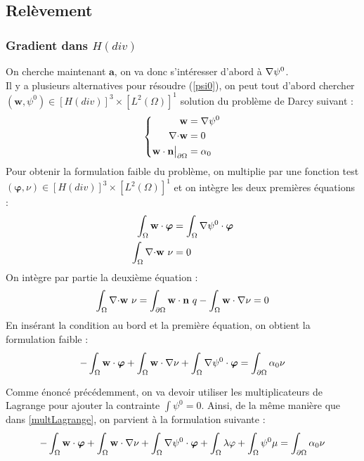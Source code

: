 \subsection{Relèvement}
\label{relev}

\subsubsection{Gradient dans $H(div)$}

On cherche maintenant $\mathbf{a}$, on va donc s'intéresser d'abord à ${\nabla}\psi^0$.\\
Il y a plusieurs alternatives pour résoudre (\ref{psi0}), on peut tout d'abord chercher $(\mathbf{w},\psi^0)\in [H(div)]^3\times [L^2(\Omega)]^1$ solution du problème de Darcy suivant :
\begin{equation}
\label{pbpsidiv}
\left\{
\begin{aligned}
\mathbf{w} &= {\nabla} \psi^0\\
{\nabla\cdot} \mathbf{w} &= 0\\
\mathbf{w}\cdot \mathbf{n}{\big\rvert_{\partial\Omega}} &= \alpha_0
\end{aligned}
\right.
\end{equation}
Pour obtenir la formulation faible du problème, on multiplie par une fonction test $(\bm{\varphi},\nu)\in [H(div)]^3\times [L^2(\Omega)]^1$ et on intègre les deux premières équations :
\begin{align*}
\int_\Omega \mathbf{w}\cdot\bm{\varphi} &= \int_\Omega {\nabla}\psi^0\cdot\bm{\varphi}\\
\int_\Omega {\nabla\cdot} \mathbf{w}\ \nu &= 0
\end{align*}
On intègre par partie la deuxième équation :
\[
\int_\Omega {\nabla\cdot} \mathbf{w}\ \nu = \int_{\partial\Omega} \mathbf{w}\cdot \mathbf{n}\ q - \int_\Omega \mathbf{w}\cdot{\nabla}\nu = 0 
\]
En insérant la condition au bord et la première équation, on obtient la formulation faible :
\[
-\int_\Omega \mathbf{w}\cdot\bm{\varphi} + \int_\Omega \mathbf{w}\cdot{\nabla}\nu + \int_\Omega {\nabla}\psi^0\cdot\bm{\varphi}  = \int_{\partial\Omega} \alpha_0\nu
\]

Comme énoncé précédemment, on va devoir utiliser les multiplicateurs de Lagrange pour ajouter la contrainte $\int \psi^0=0$. Ainsi, de la même manière que dans \ref{multLagrange}, on parvient à la formulation suivante :
\begin{equation}
\label{fvpsidiv}
-\int_\Omega \mathbf{w}\cdot\bm{\varphi} + \int_\Omega \mathbf{w}\cdot{\nabla}\nu + \int_\Omega {\nabla}\psi^0\cdot\bm{\varphi} + \int_\Omega \lambda\varphi + \int_\Omega \psi^0\mu = \int_{\partial\Omega} \alpha_0\nu
\end{equation}

